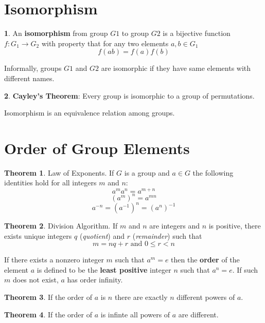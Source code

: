\documentclass[a4paper,12pt]{article}
\theoremstyle{definition}
\newtheorem{definition}{}[section]
\theoremstyle{axiom}
\theoremstyle{theorem}
\newtheorem{theorem}{Theorem}[section]
\begin{document}
\section{Isomorphism}
\begin{definition}{}
    An \textbf{isomorphism} from group $G1$ to group $G2$ is a bijective function $f: G_1 \to G_2$ with property that for any two elements $a, b \in G_1$
        \begin{equation}
                f(ab) = f(a)f(b)
        \end{equation}
\end{definition}
Informally, groups $G1$ and $G2$ are isomorphic if they have same elements with different names.
\begin{definition}{}
    \textbf{Cayley's Theorem}: Every group is isomorphic to a group of permutations.
\end{definition}
Isomorphism is an equivalence relation among groups.
\section{Order of Group Elements}
\begin{theorem}{Law of Exponents.}
    If $G$ is a group and $a \in G$ the following identities hold for all integers $m$ and $n$:
        \begin{equation*}\tag{i}
            a^ma^n = a^{m+n}
        \end{equation*}
        \begin{equation*}\tag{ii}
            (a^m)^n = a^{mn}
        \end{equation*}
        \begin{equation*}\tag{iii}
            a^{-n} = (a^{-1})^n = (a^n)^{-1}
        \end{equation*}
\end{theorem}
\begin{theorem}{Division Algorithm.}
        If $m$ and $n$ are integers and $n$ is positive, there exists unique integers $q$ (\textit{quotient}) and $r$ (\textit{remainder}) such that 
    \begin{equation*}
            m = nq + r \text{ and } 0 \leq r < n
    \end{equation*}
\end{theorem}
If there exists a nonzero integer $m$ such that $a^m=e$ then the \textbf{order} of the element $a$ is defined to be the \textbf{least positive} integer $n$ such that $a^n=e$. If such $m$ does not exist, $a$ has order infinity.
\begin{theorem}{}
        If the order of $a$ is $n$ there are exactly $n$ different powers of $a$.
\end{theorem}
\begin{theorem}{}
        If the order of $a$ is infinte all powers of $a$ are different.
\end{theorem}
\end{document}
